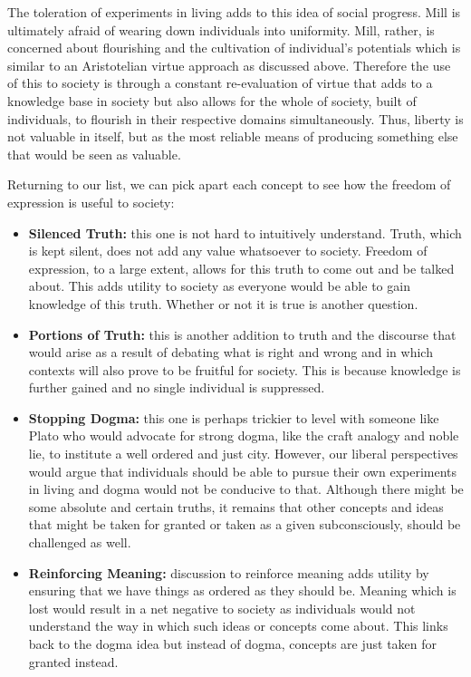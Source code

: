 \documentclass[12pt, letterpaper]{article}
\begin{document}
The toleration of experiments in living adds to this idea of social progress. Mill is ultimately afraid of wearing down individuals into uniformity. Mill, rather, is concerned about flourishing and the cultivation of individual's potentials which is similar to an Aristotelian virtue approach as discussed above. Therefore the use of this to society is through a constant re-evaluation of virtue that adds to a knowledge base in society but also allows for the whole of society, built of individuals, to flourish in their respective domains simultaneously. Thus, liberty is not valuable in itself, but as the most reliable means of producing something else that would be seen as valuable.

Returning to our list, we can pick apart each concept to see how the freedom of expression is useful to society:
\begin{itemize}
	\item \textbf{Silenced Truth:} this one is not hard to intuitively understand. Truth, which is kept silent, does not add any value whatsoever to society. Freedom of expression, to a large extent, allows for this truth to come out and be talked about. This adds utility to society as everyone would be able to gain knowledge of this truth. Whether or not it is true is another question.
	\item \textbf{Portions of Truth:} this is another addition to truth and the discourse that would arise as a result of debating what is right and wrong and in which contexts will also prove to be fruitful for society. This is because knowledge is further gained and no single individual is suppressed.
	\item \textbf{Stopping Dogma:} this one is perhaps trickier to level with someone like Plato who would advocate for strong dogma, like the craft analogy and noble lie, to institute a well ordered and just city. However, our liberal perspectives would argue that individuals should be able to pursue their own experiments in living and dogma would not be conducive to that. Although there might be some absolute and certain truths, it remains that other concepts and ideas that might be taken for granted or taken as a given subconsciously, should be challenged as well.
	\item \textbf{Reinforcing Meaning:} discussion to reinforce meaning adds utility by ensuring that we have things as ordered as they should be. Meaning which is lost would result in a net negative to society as individuals would not understand the way in which such ideas or concepts come about. This links back to the dogma idea but instead of dogma, concepts are just taken for granted instead.
\end{itemize}
\end{document}
